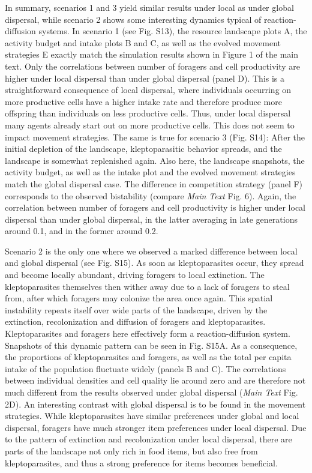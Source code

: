 {In summary, scenarios 1 and 3 yield similar results under local as under global dispersal, while scenario 2 shows some interesting dynamics typical of reaction-diffusion systems.
In scenario 1 (see Fig. S13), the resource landscape plots A, the activity budget and intake plots B and C, as well as the evolved movement strategies E exactly match the simulation results shown in Figure 1 of the main text. Only the correlations between number of foragers and cell productivity are higher under local dispersal than under global dispersal (panel D).
This is a straightforward consequence of local dispersal, where individuals occurring on more productive cells have a higher intake rate and therefore produce more offspring than individuals on less productive cells. Thus, under local dispersal many agents already start out on more productive cells. This does not seem to impact movement strategies.
The same is true for scenario 3 (Fig. S14): After the initial depletion of the landscape, kleptoparasitic behavior spreads, and the landscape is somewhat replenished again. Also here, the landscape snapshots, the activity budget, as well as the intake plot and the evolved movement strategies match the global dispersal case. The difference in competition strategy (panel F) corresponds to the observed bistability (compare \emph{Main Text} Fig. 6). Again, the correlation between number of foragers and cell productivity is higher under local dispersal than under global dispersal, in the latter averaging in late generations around 0.1, and in the former around 0.2.

Scenario 2 is the only one where we observed a marked difference between local and global dispersal (see Fig. S15). As soon as kleptoparasites occur, they spread and become locally abundant, driving foragers to local extinction. The kleptoparasites themselves then wither away due to a lack of foragers to steal from, after which foragers may colonize the area once again. This spatial instability repeats itself over wide parts of the landscape, driven by the extinction, recolonization and diffusion of foragers and kleptoparasites. Kleptoparasites and foragers here effectively form a reaction-diffusion system. Snapshots of this dynamic pattern can be seen in Fig. S15A. As a consequence, the proportions of kleptoparasites and foragers, as well as the total per capita intake of the population fluctuate widely (panels B and C). The correlations between individual densities and cell quality lie around zero and are therefore not much different from the results observed under global dispersal (\emph{Main Text} Fig. 2D). An interesting contrast with global dispersal is to be found in the movement strategies. While kleptoparasites have similar preferences under global and local dispersal, foragers have much stronger item preferences under local dispersal. Due to the pattern of extinction and recolonization under local dispersal, there are parts of the landscape not only rich in food items, but also free from kleptoparasites, and thus a strong preference for items becomes beneficial.

}

